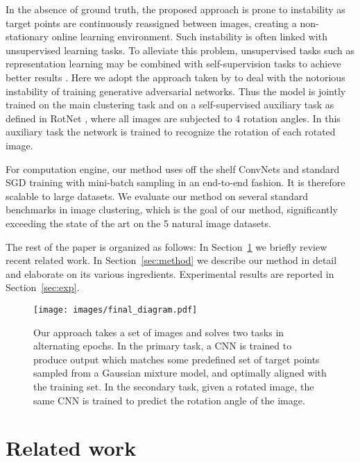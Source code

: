 \documentclass[a4paper,conference]{IEEEtran}
\begin{document}
In the absence of ground truth, the proposed approach is prone to instability as target points are continuously reassigned between images, creating a non-stationary online learning environment. Such instability is often linked with unsupervised learning tasks. To alleviate this problem, unsupervised tasks such as representation learning may be combined with self-supervision tasks to achieve better results \cite{doersch2017multi}. Here we adopt the approach taken by \cite{chen2018ssgan} to deal with the notorious instability of training generative adversarial networks. Thus the model is jointly trained on the main clustering task and on a self-supervised auxiliary task as defined in RotNet \cite{gidaris2018unsupervised}, where all images are subjected to 4 rotation angles. In this auxiliary task the network is trained to recognize the  rotation of each rotated image. 

For computation engine, our method uses off the shelf ConvNets and standard SGD training with mini-batch sampling in an end-to-end fashion. It is therefore scalable to large datasets. We evaluate our method on several standard benchmarks in image clustering, which is the goal of our method, significantly exceeding the state of the art on the 5 natural image datasets.

The rest of the paper is organized as follows: In Section~\ref{sec:related} we briefly review recent related work. In Section~\ref{sec:method} we describe our method in detail and elaborate on its various ingredients. Experimental results are reported in Section~\ref{sec:exp}.

\begin{figure*}[t]
\begin{center}
    \texttt{[image: images/final\_diagram.pdf]}
\end{center}
   \caption{Our approach takes a set of images and solves two tasks in alternating epochs. In the primary task, a CNN is trained to produce output which matches some predefined set of target points sampled from a Gaussian mixture model, and optimally aligned with the training set. In the secondary task, given a rotated image, the same CNN is trained to predict the rotation angle of the image. }
\label{fig:short}
\end{figure*}

\section{Related work}
\label{sec:related}
\end{document}
